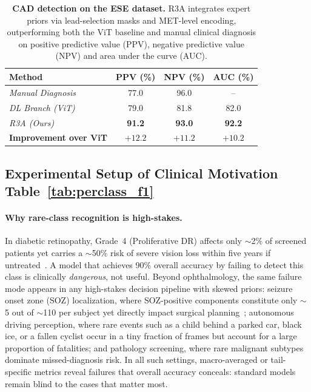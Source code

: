 \documentclass{article}
\begin{document}
\begin{table}[h]
\centering
\scriptsize
\setlength{\tabcolsep}{4pt}
\renewcommand{\arraystretch}{1.15}
\caption{\textbf{CAD detection on the ESE dataset.} R3A integrates expert
priors via lead-selection masks and MET-level encoding, outperforming
both the ViT baseline and manual clinical diagnosis on positive predictive value (PPV),  negative predictive
value (NPV) and area under the curve (AUC).}
\label{tab:cad_results}
\begin{tabular}{lccc}
\toprule
\textbf{Method} & \textbf{PPV (\%)} & \textbf{NPV (\%)} & \textbf{AUC (\%)} \\
\midrule
\textit{Manual Diagnosis}     & 77.0          & 96.0          & --            \\
\textit{DL Branch (ViT)}      & 79.0          & 81.8          & 82.0          \\
\textit{R3A (Ours)}           & \textbf{91.2} & \textbf{93.0} & \textbf{92.2} \\
\midrule
\rowcolor[gray]{0.95}
\textbf{Improvement over ViT} & $\mathbf{+12.2}$ & $\mathbf{+11.2}$ & $\mathbf{+10.2}$ \\
\bottomrule
\end{tabular}
\end{table}

\newpage
\subsection{Experimental Setup of Clinical Motivation Table~\ref{tab:perclass_f1}}
\label{table1}
\paragraph{Why rare-class recognition is high-stakes.}
In diabetic retinopathy, Grade~4 (Proliferative DR) affects only $\sim$2\% of screened patients yet carries a $\sim$50\% risk of severe vision loss within five years if untreated~\cite{etdrs1991}. A model that achieves 90\% overall accuracy by failing to detect this class is clinically \emph{dangerous}, not useful. Beyond ophthalmology, the same failure mode appears in any high-stakes decision pipeline with skewed priors: seizure onset zone (SOZ) localization, where SOZ-positive components constitute only $\sim$5 out of $\sim$110 per subject yet directly impact surgical planning~\cite{kamboj2024expert}; autonomous driving perception, where rare events such as a child behind a parked car, black ice, or a fallen cyclist occur in a tiny fraction of frames but account for a large proportion of fatalities; and pathology screening, where rare malignant subtypes dominate missed-diagnosis risk. In all such settings, macro-averaged or tail-specific metrics reveal failures that overall accuracy conceals: standard models remain blind to the cases that matter most.
\end{document}
